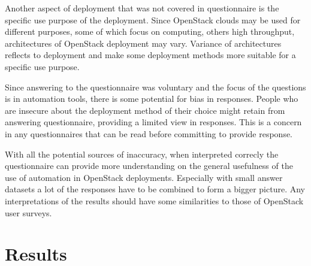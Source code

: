 \documentclass[officiallayout]{tktla}
\begin{document}
Another aspect of deployment that was not covered in questionnaire is the
specific use purpose of the deployment. Since OpenStack clouds may be used for
different purposes, some of which focus on computing, others high throughput,
architectures of OpenStack deployment may vary. Variance of architectures
reflects to deployment and make some deployment methods more suitable for a
specific use purpose.

Since answering to the questionnaire was voluntary and the focus of the
questions is in automation tools, there is some potential for bias in
responses. People who are insecure about the deployment method of their choice
might retain from answering questionnaire, providing a limited view in
responses. This is a concern in any questionnaires that can be read before
committing to provide response.

With all the potential sources of inaccuracy, when interpreted correcly the
questionnaire can provide more understanding on the general usefulness of the
use of automation in OpenStack deployments. Especially with small answer
datasets a lot of the responses have to be combined to form a bigger picture.
Any interpretations of the results should have some similarities to those of
OpenStack user surveys.

\section{Results}
\end{document}
